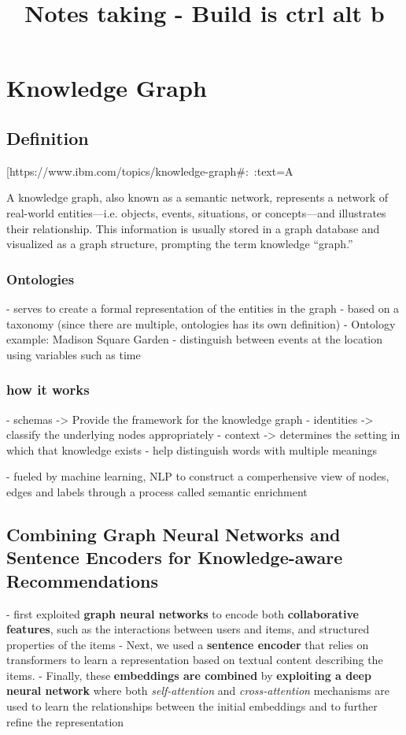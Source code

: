 \documentclass{report}
\title{Notes taking - Build is ctrl alt b}
\begin{document}
\maketitle
\chapter{Knowledge Graph}

\section{Definition}
[https://www.ibm.com/topics/knowledge-graph#:~:text=A%

A knowledge graph, also known as a semantic network, represents a network of real-world entities—i.e. objects, events, situations, or concepts—and illustrates their relationship. This information is usually stored in a graph database and visualized as a graph structure, prompting the term knowledge “graph.”

\subsection{Ontologies}
- serves to create a formal representation of the entities in the graph
- based on a taxonomy (since there are multiple, ontologies has its own definition)
- Ontology example: Madison Square Garden
    - distinguish between events at the location using variables such as time

\subsection{how it works}
- schemas -> Provide the framework for the knowledge graph
- identities -> classify the underlying nodes appropriately
- context -> determines the setting in which that knowledge exists
    - help distinguish words with multiple meanings

- fueled by machine learning, NLP to construct a comperhensive view of nodes, edges and labels through a process called semantic enrichment



\section{Combining Graph Neural Networks and Sentence Encoders for
Knowledge-aware Recommendations}
- first exploited\textbf{ graph neural networks} to encode both \textbf{collaborative features}, such as the interactions between users and items, and structured properties of the items
- Next, we used a\textbf{ sentence encoder} that relies on transformers to learn a representation based on textual content describing the items. 
- Finally, these \textbf{embeddings are combined }by \textbf{exploiting a deep neural network }where both \textit{self-attention }and\textit{ cross-attention} mechanisms are used to learn the
relationships between the initial embeddings and to further refine
the representation
\end{document}
